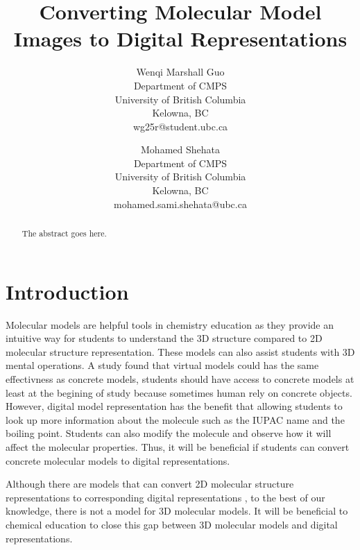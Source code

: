 \documentclass{article}
\begin{document}
\title{Converting Molecular Model Images to Digital Representations}


\author{Wenqi Marshall Guo\\
Department of CMPS\\
University of British Columbia\\
Kelowna, BC\\
wg25r@student.ubc.ca 
\and
Mohamed Shehata\\
Department of CMPS\\
University of British Columbia\\
Kelowna, BC\\
mohamed.sami.shehata@ubc.ca
}

\maketitle


\begin{abstract}
The abstract goes here.
\end{abstract}


\section{Introduction}
Molecular models are helpful tools in chemistry education as they provide an intuitive way for students to understand the 3D structure compared to 2D molecular structure representation. These models can also assist students with 3D mental operations. 
A study \cite{savec_evaluating_2005} found that virtual models could has the same effectivness as concrete models, students should have access to concrete models at least at the begining of study because sometimes human rely on concrete objects.  
However, digital model representation has the benefit that allowing students to look up more information about the molecule such as the IUPAC name and the boiling point. Students can also modify the molecule and observe how it will affect the molecular properties. Thus, it will be beneficial if students can convert concrete molecular models to digital representations. 

Although there are models that can convert 2D molecular structure representations to corresponding digital representations \autocite{swinocsr}\autocite{decimer}\autocite{chempix}, to the best of our knowledge, there is not a model for 3D molecular models. It will be beneficial to chemical education to close this gap between 3D molecular models and digital representations. 
\end{document}
